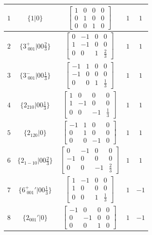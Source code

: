 \documentclass[fleqn,8pt]{jsarticle}
\begin{document}
\begin{longtable}{ccccc}
$ 1 $ & $ \{1|0\} $ & $ \begin{bmatrix} 1 & 0 & 0 & 0 \\ 0 & 1 & 0 & 0 \\ 0 & 0 & 1 & 0 \end{bmatrix} $ & $ 1 $ & $ 1 $ \\ \hline
$ 2 $ & $ \{3^{+}_{\,\,001}|0 0 \frac{2}{3}\} $ & $ \begin{bmatrix} 0 & -1 & 0 & 0 \\ 1 & -1 & 0 & 0 \\ 0 & 0 & 1 & \frac{2}{3} \end{bmatrix} $ & $ 1 $ & $ 1 $ \\ \hline
$ 3 $ & $ \{3^{-}_{\,\,001}|0 0 \frac{1}{3}\} $ & $ \begin{bmatrix} -1 & 1 & 0 & 0 \\ -1 & 0 & 0 & 0 \\ 0 & 0 & 1 & \frac{1}{3} \end{bmatrix} $ & $ 1 $ & $ 1 $ \\ \hline
$ 4 $ & $ \{2{}_{210}|0 0 \frac{1}{3}\} $ & $ \begin{bmatrix} 1 & 0 & 0 & 0 \\ 1 & -1 & 0 & 0 \\ 0 & 0 & -1 & \frac{1}{3} \end{bmatrix} $ & $ 1 $ & $ 1 $ \\ \hline
$ 5 $ & $ \{2{}_{120}|0\} $ & $ \begin{bmatrix} -1 & 1 & 0 & 0 \\ 0 & 1 & 0 & 0 \\ 0 & 0 & -1 & 0 \end{bmatrix} $ & $ 1 $ & $ 1 $ \\ \hline
$ 6 $ & $ \{2{}_{1-10}|0 0 \frac{2}{3}\} $ & $ \begin{bmatrix} 0 & -1 & 0 & 0 \\ -1 & 0 & 0 & 0 \\ 0 & 0 & -1 & \frac{2}{3} \end{bmatrix} $ & $ 1 $ & $ 1 $ \\ \hline
$ 7 $ & $ \{6^{+}_{\,\,001}{}'|0 0 \frac{1}{3}\} $ & $ \begin{bmatrix} 1 & -1 & 0 & 0 \\ 1 & 0 & 0 & 0 \\ 0 & 0 & 1 & \frac{1}{3} \end{bmatrix} $ & $ 1 $ & $ -1 $ \\ \hline
$ 8 $ & $ \{2{}_{001}{}'|0\} $ & $ \begin{bmatrix} -1 & 0 & 0 & 0 \\ 0 & -1 & 0 & 0 \\ 0 & 0 & 1 & 0 \end{bmatrix} $ & $ 1 $ & $ -1 $ \\ \hline

\end{longtable}
\end{document}
